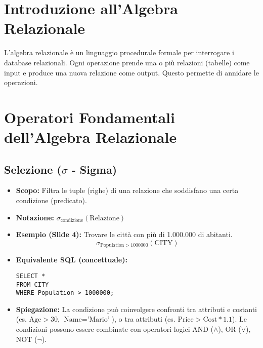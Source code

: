 \section{Introduzione all'Algebra Relazionale}
L'algebra relazionale è un linguaggio procedurale formale per interrogare i database relazionali. Ogni operazione prende una o più relazioni (tabelle) come input e produce una nuova relazione come output. Questo permette di annidare le operazioni.\section{Operatori Fondamentali dell'Algebra Relazionale}

\subsection{Selezione (\texorpdfstring{$\sigma$}{sigma} - Sigma)}
\begin{itemize}
    \item \textbf{Scopo:} Filtra le tuple (righe) di una relazione che soddisfano una certa condizione (predicato).
    \item \textbf{Notazione:} $\sigma_{\text{condizione}}(\text{Relazione})$
    \item \textbf{Esempio (Slide 4):} Trovare le città con più di 1.000.000 di abitanti.
          \[ \sigma_{\text{Population}>1000000}(\text{CITY}) \]
    \item \textbf{Equivalente SQL (concettuale):}
\begin{verbatim}
SELECT *
FROM CITY
WHERE Population > 1000000;
\end{verbatim}
    \item \textbf{Spiegazione:} La condizione può coinvolgere confronti tra attributi e costanti (es. $\text{Age} > 30$, $\text{Name} = \text{'Mario'}$), o tra attributi (es. $\text{Price} > \text{Cost}*1.1$). Le condizioni possono essere combinate con operatori logici AND ($\wedge$), OR ($\vee$), NOT ($\neg$).
\end{itemize}

